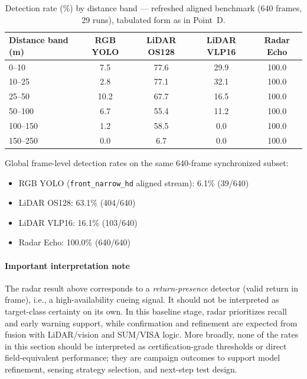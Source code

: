 \begin{table}[ht]
  \centering
  \caption{Detection rate (\%) by distance band --- refreshed aligned benchmark (640 frames, 29 runs), tabulated form as in Point~D.}
  \label{tab:det-rate-distance}
  \begin{tabular}{lcccc}
    \hline
    \textbf{Distance band (m)} & \textbf{RGB YOLO} & \textbf{LiDAR OS128} & \textbf{LiDAR VLP16} & \textbf{Radar Echo} \\
    \hline
    0--10   &  7.5 & 77.6 & 29.9 & 100.0 \\
    10--25  &  2.8 & 77.1 & 32.1 & 100.0 \\
    25--50  & 10.2 & 67.7 & 16.5 & 100.0 \\
    50--100 &  6.7 & 55.4 & 11.2 & 100.0 \\
    100--150&  1.2 & 58.5 &  0.0 & 100.0 \\
    150--250&  0.0 &  6.7 &  0.0 & 100.0 \\
    \hline
  \end{tabular}
\end{table}

Global frame-level detection rates on the same 640-frame synchronized subset:
\begin{itemize}
  \item RGB YOLO (\texttt{front\_narrow\_hd} aligned stream): 6.1\% (39/640)
  \item LiDAR OS128: 63.1\% (404/640)
  \item LiDAR VLP16: 16.1\% (103/640)
  \item Radar Echo: 100.0\% (640/640)
\end{itemize}

\paragraph{Important interpretation note}
The radar result above corresponds to a \emph{return-presence} detector (valid return in frame), i.e., a high-availability cueing signal. It should not be interpreted as target-class certainty on its own. In this baseline stage, radar prioritizes recall and early warning support, while confirmation and refinement are expected from fusion with LiDAR/vision and SUM/VISA logic.
More broadly, none of the rates in this section should be interpreted as certification-grade thresholds or direct field-equivalent performance; they are campaign outcomes to support model refinement, sensing strategy selection, and next-step test design.

